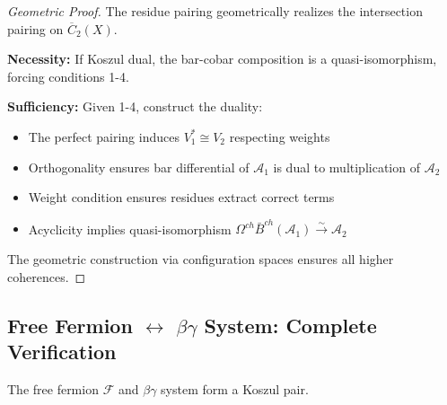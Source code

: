 \begin{proof}[Geometric Proof]
The residue pairing geometrically realizes the intersection pairing on $\overline{C}_2(X)$.

\textbf{Necessity:} If Koszul dual, the bar-cobar composition is a quasi-isomorphism, forcing conditions 1-4.

\textbf{Sufficiency:} Given 1-4, construct the duality:
\begin{itemize}
\item The perfect pairing induces $V_1^* \cong V_2$ respecting weights
\item Orthogonality ensures bar differential of $\mathcal{A}_1$ is dual to multiplication of $\mathcal{A}_2$
\item Weight condition ensures residues extract correct terms
\item Acyclicity implies quasi-isomorphism $\Omega^{ch}\bar{B}^{ch}(\mathcal{A}_1) \xrightarrow{\sim} \mathcal{A}_2$
\end{itemize}

The geometric construction via configuration spaces ensures all higher coherences.
\end{proof}

\subsection{Free Fermion $\leftrightarrow$ $\beta\gamma$ System: Complete Verification}

\begin{theorem}
The free fermion $\mathcal{F}$ and $\beta\gamma$ system form a Koszul pair.
\end{theorem}


